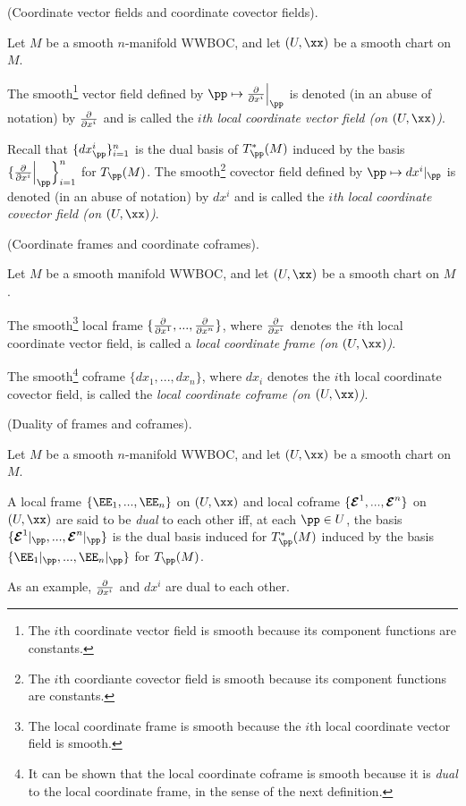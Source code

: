 \begin{defn}
     (Coordinate vector fields and coordinate covector fields).
    
    Let $M$ be a smooth $n$-manifold WWBOC, and let  $(U, \xx)$ be a smooth chart on $M$.
    
    The smooth\footnote{The $i$th coordinate vector field is smooth because its component functions are constants.} vector field defined by $\pp \mapsto \frac{\pd}{\pd x^i}\Big|_\pp$ is denoted (in an abuse of notation) by $\frac{\partial}{\partial x^i}$ and is called the \textit{$i$th local coordinate vector field (on $(U, \xx)$)}. 
    
    Recall that $\{ dx^i_\pp \}_{i = 1}^n$ is the dual basis of $T_\pp^*(M)$ induced by the basis $\{ \frac{\pd}{\pd x^i}\Big|_\pp \Big\}_{i = 1}^n$ for $T_\pp(M)$. The smooth\footnote{The $i$th coordiante covector field is smooth because its component functions are constants.} covector field defined by $\pp \mapsto dx^i|_\pp$ is denoted (in an abuse of notation) by $dx^i$ and is called the \textit{$i$th local coordinate covector field (on $(U, \xx)$)}.
\end{defn}

\begin{defn}
\label{ch::manifolds::defn::coordinate_frames_coframes}
     (Coordinate frames and coordinate coframes).
    
    Let $M$ be a smooth manifold WWBOC, and let $(U, \xx)$ be a smooth chart on $M$.
    
    The smooth\footnote{The local coordinate frame is smooth because the $i$th local coordinate vector field is smooth.} local frame $\{\frac{\partial}{\partial x^1}, ..., \frac{\partial}{\partial x^n} \}$, where $\frac{\partial}{\partial x^i}$ denotes the $i$th local coordinate vector field, is called a \textit{local coordinate frame (on $(U, \xx)$)}.
    
    The smooth\footnote{It can be shown that the local coordinate coframe is smooth because it is \textit{dual} to the local coordinate frame, in the sense of the next definition.} coframe $\{dx_1, ..., dx_n\}$, where $dx_i$ denotes the $i$th local coordinate covector field, is called the \textit{local coordinate coframe (on $(U, \xx)$)}.
\end{defn}

\begin{defn}
     (Duality of frames and coframes).

    Let $M$ be a smooth $n$-manifold WWBOC, and let $(U, \xx)$ be a smooth chart on $M$.
    
    A local frame $\{\EE_1, ..., \EE_n\}$ on $(U, \xx)$ and local coframe $\{\boldsymbol{\mathcal{E}}^1, ..., \boldsymbol{\mathcal{E}}^n\}$ on $(U, \xx)$ are said to be \textit{dual} to each other iff, at each $\pp \in U$, the basis $\{\EEE^1|_\pp, ..., \EEE^n|_\pp\}$ is the dual basis induced for $T_\pp^*(M)$ induced by the basis $\{\EE_1|_\pp, ..., \EE_n|_\pp\}$ for $T_\pp(M)$. 
    
    As an example, $\frac{\partial}{\partial x^i}$ and $dx^i$ are dual to each other.
\end{defn}

